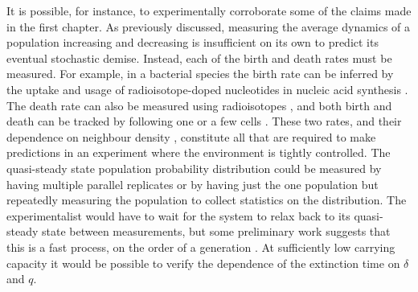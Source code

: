 It is possible, for instance, to experimentally corroborate some of the claims made in the first chapter. %
As previously discussed, measuring the average dynamics of a population increasing and decreasing is insufficient on its own to predict its eventual stochastic demise. 
Instead, each of the birth and death rates must be measured. 
For example, in a bacterial species the birth rate can be inferred by the uptake and usage of radioisotope-doped nucleotides in nucleic acid synthesis \cite{Kirchman1982}. 
The death rate can also be measured using radioisotopes \cite{Servais1985}, and both birth and death can be tracked by following one or a few cells \cite{Wheeler2003,Groisman2005,Wang2010,Lee2012,Grunberger2014}. %
These two rates, and their dependence on neighbour density \cite{Nadell2008,Vulic2001,Greenhalgh1990,VanMelderen2009,Rankin2012}, constitute all that are required to make predictions in an experiment where the environment is tightly controlled. 
The quasi-steady state population probability distribution could be measured by having multiple parallel replicates or by having just the one population but repeatedly measuring the population to collect statistics on the distribution. 
The experimentalist would have to wait for the system to relax back to its quasi-steady state between measurements, but some preliminary work suggests that this is a fast process, on the order of a generation \cite{Badali2019b}. 
At sufficiently low carrying capacity it would be possible to verify the dependence of the extinction time on $\delta$ and $q$. 

